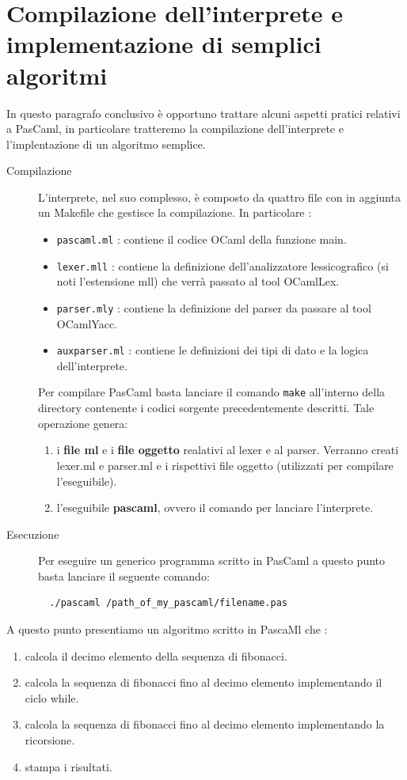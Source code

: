 \documentclass[a4paper,10pt]{article}
\begin{document}
\section{Compilazione dell'interprete e implementazione di semplici algoritmi}
In questo paragrafo conclusivo \`e opportuno trattare alcuni aspetti pratici
relativi a PasCaml, in particolare tratteremo la compilazione dell'interprete e
l'implentazione di un algoritmo semplice.

\begin{description}
 \item [Compilazione] L'interprete, nel suo complesso, \`e composto da quattro
file con in aggiunta un Makefile che gestisce la compilazione. In particolare :

\begin{itemize}
 \item \verb|pascaml.ml| : contiene il codice OCaml della funzione main.
 \item \verb|lexer.mll| : contiene la definizione dell'analizzatore
lessicografico (si noti l'estensione mll) che verr\`a passato al tool OCamlLex.
 \item \verb|parser.mly| : contiene la definizione del parser da passare al
tool OCamlYacc.
 \item \verb|auxparser.ml| : contiene le definizioni dei tipi di dato e la
logica dell'interprete.
\end{itemize}

Per compilare PasCaml basta lanciare il comando \verb|make|
all'interno della directory contenente 
i codici sorgente precedentemente descritti. Tale operazione genera: 

\begin{enumerate}
 \item i \textbf{file ml} e i \textbf{file oggetto}  realativi al lexer e al
parser. Verranno creati lexer.ml e parser.ml e i rispettivi file oggetto
(utilizzati per compilare l'eseguibile).
\item l'eseguibile \textbf{pascaml}, ovvero il comando per lanciare
l'interprete.

\end{enumerate}
 \item [Esecuzione] Per eseguire un generico programma scritto in PasCaml a
questo punto basta lanciare il seguente comando:

\begin{verbatim}
  ./pascaml /path_of_my_pascaml/filename.pas
\end{verbatim}

\end{description}
A questo punto presentiamo un algoritmo scritto in PascaMl che :
\begin{enumerate}
 \item calcola il decimo elemento della sequenza di fibonacci.
 \item calcola la sequenza di fibonacci fino al decimo elemento implementando
il ciclo while.
 \item calcola la sequenza di fibonacci fino al decimo elemento implementando
la ricorsione.
 \item stampa i risultati.
\end{enumerate}
\end{document}
